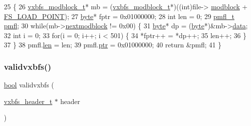 \begin{DoxyCode}
25                                      \{
26     \hyperlink{a00332}{vxbfs\_modblock\_t}* mb = (\hyperlink{a00332}{vxbfs\_modblock\_t}*)((\textcolor{keywordtype}{int})file->
      \hyperlink{a00336_a56503c715b4121591ca7367c9cbd7093_a56503c715b4121591ca7367c9cbd7093}{modblock} + \hyperlink{a00134_ade5f4f9306a7cacc0cb2a518bd97e237_ade5f4f9306a7cacc0cb2a518bd97e237}{FS\_LOAD\_POINT});
27     \hyperlink{a00140_ab8ef12fab634c171394422d0ee8baf94_ab8ef12fab634c171394422d0ee8baf94}{byte}* fptr = 0x01000000;
28     \textcolor{keywordtype}{int} len = 0;
29     \hyperlink{a00320}{pmfl\_t} \hyperlink{a00320}{pmfl};
30     \textcolor{keywordflow}{while}(mb->\hyperlink{a00332_afbf261c73a36b4d33e8a8b5179d4385b_afbf261c73a36b4d33e8a8b5179d4385b}{nextmodblock} != 0x00) \{
31         \hyperlink{a00140_ab8ef12fab634c171394422d0ee8baf94_ab8ef12fab634c171394422d0ee8baf94}{byte}* dp = (\hyperlink{a00140_ab8ef12fab634c171394422d0ee8baf94_ab8ef12fab634c171394422d0ee8baf94}{byte}*)&mb->\hyperlink{a00332_a327348a3ea3a02cfde4cdb1ccdcf2073_a327348a3ea3a02cfde4cdb1ccdcf2073}{data};
32         \textcolor{keywordtype}{int} i = 0;
33         \textcolor{keywordflow}{for}(i = 0; i++; i < 501) \{
34             *fptr++ = *dp++;
35             len++;
36         \}
37     \}
38     pmfl.\hyperlink{a00320_ae4da44b065ddc955692df6fddd24a9c4_ae4da44b065ddc955692df6fddd24a9c4}{len} = len;
39     pmfl.\hyperlink{a00320_a150c011a31f99dbd408f8650f3fa1089_a150c011a31f99dbd408f8650f3fa1089}{ptr} = 0x01000000;
40     \textcolor{keywordflow}{return} &pmfl;
41 \}
\end{DoxyCode}
\mbox{\label{a00203_a078a66e7d52fd4a6df768277b605199c_a078a66e7d52fd4a6df768277b605199c}} 
\subsubsection{\texorpdfstring{validvxbfs()}{validvxbfs()}}
{\footnotesize\ttfamily \hyperlink{a00140_af6a258d8f3ee5206d682d799316314b1_af6a258d8f3ee5206d682d799316314b1}{bool} validvxbfs (\begin{DoxyParamCaption}\item[{\hyperlink{a00206_ac5678b6d5dd5ed5ca86e5ccd4c30d39d_ac5678b6d5dd5ed5ca86e5ccd4c30d39d}{vxbfs\+\_\+header\+\_\+t} $\ast$}]{header }\end{DoxyParamCaption})}



